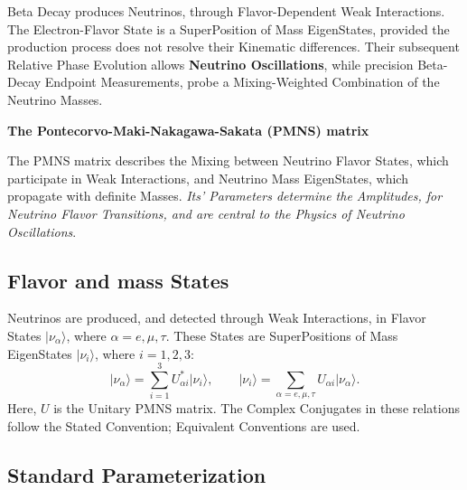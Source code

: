 \documentclass[a4paper, 10pt, onepage]{elegantbook}
\begin{document}
{Beta Decay produces Neutrinos, through Flavor-Dependent Weak Interactions. The Electron-Flavor State is a SuperPosition 
of Mass EigenStates, provided the production process does not resolve their Kinematic differences. Their subsequent 
Relative Phase Evolution allows \textbf{Neutrino Oscillations}, while precision Beta-Decay Endpoint Measurements, probe 
a Mixing-Weighted Combination of the Neutrino Masses.  

    \textbf{The Pontecorvo-Maki-Nakagawa-Sakata (PMNS) matrix}  

\noindent

The PMNS matrix describes the Mixing between Neutrino Flavor States, which participate in Weak Interactions, and 
Neutrino Mass EigenStates, which propagate with definite Masses. \emph{Its' Parameters determine the Amplitudes, for 
Neutrino Flavor Transitions, and are central to the Physics of Neutrino Oscillations}.

\subsection{Flavor and mass States}

\noindent

Neutrinos are produced, and detected through Weak Interactions, in Flavor States $\lvert \nu_\alpha\rangle$, where 
$\alpha=e,\mu,\tau$. These States are SuperPositions of Mass EigenStates $\lvert \nu_i\rangle$, where $i=1,2,3$: 
\begin{equation}
  \lvert \nu_\alpha\rangle
  = \sum_{i=1}^{3} U_{\alpha i}^{*}\lvert \nu_i\rangle,
  \qquad
  \lvert \nu_i\rangle
  = \sum_{\alpha=e,\mu,\tau} U_{\alpha i}\lvert \nu_\alpha\rangle.
\end{equation}
Here, $U$ is the Unitary PMNS matrix. The Complex Conjugates in these relations follow the Stated Convention; 
Equivalent Conventions are used.

\subsection{Standard Parameterization}

}
\end{document}
